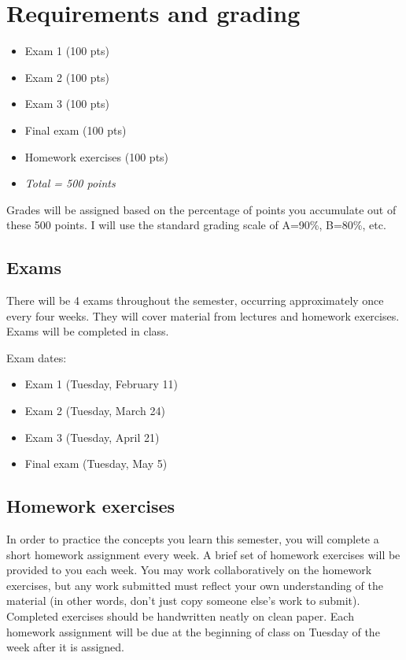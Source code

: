 \documentclass[10pt]{article}
\begin{document}
\section*{Requirements and grading}
\label{sec:org0b50d30}
\begin{itemize}
\item Exam 1 (100 pts)
\item Exam 2 (100 pts)
\item Exam 3 (100 pts)
\item Final exam (100 pts)
\item Homework exercises (100 pts)
\item \emph{Total = 500 points}
\end{itemize}

Grades will be assigned based on the percentage of points you accumulate out of these 500 points.  I will use the standard grading scale of A=90\%, B=80\%, etc.

\subsection*{Exams}
\label{sec:org2a4b0e8}
There will be 4 exams throughout the semester, occurring approximately once every four weeks.  They will cover material from lectures and homework exercises. Exams will be completed in class.

Exam dates:

\begin{itemize}
\item Exam 1 (Tuesday, February 11)
\item Exam 2 (Tuesday, March 24)
\item Exam 3 (Tuesday, April 21)
\item Final exam (Tuesday, May 5)
\end{itemize}

\subsection*{Homework exercises}
\label{sec:orgf0e9c02}
In order to practice the concepts you learn this semester, you will complete a short homework assignment every week. A brief set of homework exercises will be provided to you each week. You may work collaboratively on the homework exercises, but any work submitted must reflect your own understanding of the material (in other words, don't just copy someone else's work to submit). Completed exercises should be handwritten neatly on clean paper. Each homework assignment will be due at the beginning of class on Tuesday of the week after it is assigned.
\end{document}
